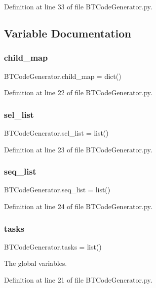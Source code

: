 Definition at line 33 of file B\+T\+Code\+Generator.\+py.



\subsection{Variable Documentation}
\mbox{\label{namespace_b_t_code_generator_a3c9566f03efe132c7c0f4ff5f918950e}} 
\subsubsection{\texorpdfstring{child\_map}{child\_map}}
{\footnotesize\ttfamily B\+T\+Code\+Generator.\+child\+\_\+map = dict()}



Definition at line 22 of file B\+T\+Code\+Generator.\+py.

\mbox{\label{namespace_b_t_code_generator_a254de4b3426d1304e8507f7817f3a7ad}} 
\subsubsection{\texorpdfstring{sel\_list}{sel\_list}}
{\footnotesize\ttfamily B\+T\+Code\+Generator.\+sel\+\_\+list = list()}



Definition at line 23 of file B\+T\+Code\+Generator.\+py.

\mbox{\label{namespace_b_t_code_generator_a966464d740a003b5d0487229396d3c86}} 
\subsubsection{\texorpdfstring{seq\_list}{seq\_list}}
{\footnotesize\ttfamily B\+T\+Code\+Generator.\+seq\+\_\+list = list()}



Definition at line 24 of file B\+T\+Code\+Generator.\+py.

\mbox{\label{namespace_b_t_code_generator_a32980cdc2e7047f834b5988eea9426a1}} 
\subsubsection{\texorpdfstring{tasks}{tasks}}
{\footnotesize\ttfamily B\+T\+Code\+Generator.\+tasks = list()}



The global variables. 



Definition at line 21 of file B\+T\+Code\+Generator.\+py.

